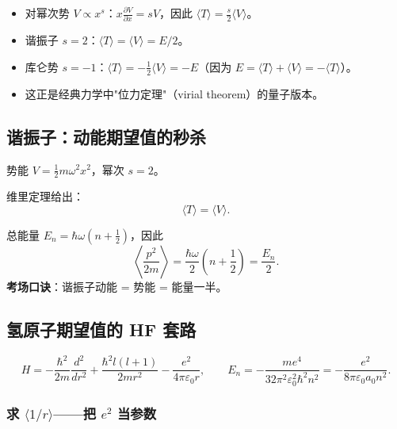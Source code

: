 \begin{insightbox}[维里定理的物理图像]
\begin{itemize}[nosep]
\item 对幂次势 $V \propto x^s$：$x\frac{\partial V}{\partial x} = sV$，因此 $\langle T\rangle = \frac{s}{2}\langle V\rangle$。
\item 谐振子 $s=2$：$\langle T\rangle = \langle V\rangle = E/2$。
\item 库仑势 $s=-1$：$\langle T\rangle = -\frac{1}{2}\langle V\rangle = -E$（因为 $E = \langle T\rangle + \langle V\rangle = -\langle T\rangle$）。
\item 这正是经典力学中"位力定理"（virial theorem）的量子版本。
\end{itemize}
\end{insightbox}

\subsection{谐振子：动能期望值的秒杀}

\begin{formulabox}
势能 $V = \frac{1}{2}m\omega^2 x^2$，幂次 $s=2$。

维里定理给出：
\[
\langle T\rangle = \langle V\rangle.
\]

总能量 $E_n = \hbar\omega(n+\frac{1}{2})$，因此
\[
\boxed{\left\langle \frac{p^2}{2m}\right\rangle = \frac{\hbar\omega}{2}\left(n+\frac{1}{2}\right) = \frac{E_n}{2}}.
\]
\textbf{考场口诀}：谐振子动能 = 势能 = 能量一半。
\end{formulabox}

\subsection{氢原子期望值的 HF 套路}

\begin{formulabox}
\[
H = -\frac{\hbar^2}{2m}\frac{d^2}{dr^2} + \frac{\hbar^2 l(l+1)}{2mr^2} - \frac{e^2}{4\pi\varepsilon_0 r},
\qquad
E_n = -\frac{me^4}{32\pi^2\varepsilon_0^2\hbar^2 n^2} = -\frac{e^2}{8\pi\varepsilon_0 a_0 n^2}.
\]
\end{formulabox}

\subsubsection{求 $\langle 1/r\rangle$——把 $e^2$ 当参数}

